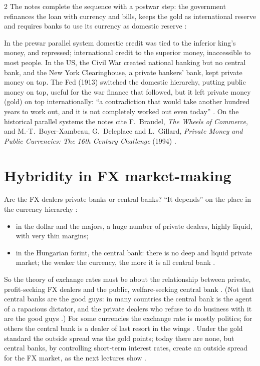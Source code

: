\begin{paracol}{2}
The notes complete the sequence with a postwar step: the government refinances the loan with currency and bills, keeps the gold as international reserve and requires banks to use its
currency as domestic reserve :
\begin{taccts}
\qquad
{}
\end{taccts}
In the prewar parallel system domestic credit was tied to the inferior king's money, and repressed; international credit to the superior money, inaccessible to most people. In the US, the
Civil War created national banking but no central bank, and the New York Clearinghouse, a private bankers' bank, kept private money on top. The Fed (1913) switched the domestic hierarchy,
putting public money on top, useful for the war finance that followed, but it left private money (gold) on top internationally: ``a contradiction that would take another hundred years to
work out, and it is not completely worked out even today'' . On the historical parallel systems the notes cite F.~Braudel, \emph{The Wheels of Commerce}, and
M.-T.~Boyer-Xambeau, G.~Deleplace and L.~Gillard, \emph{Private Money and Public Currencies: The 16th Century Challenge} (1994) .

\section{Hybridity in FX market-making}\label{sec:cm-fxhybrid}

Are the FX dealers private banks or central banks? ``It depends'' on the place in the currency hierarchy :
\begin{itemize}
  \item in the dollar and the majors, a huge number of private dealers, highly liquid, with very thin margins;
  \item in the Hungarian forint, the central bank: there is no deep and liquid private market; the weaker the currency, the more it is all central bank .
\end{itemize}
So the theory of exchange rates must be about the relationship between private, profit-seeking FX dealers and the public, welfare-seeking central bank .
(Not that central banks are the good guys: in many countries the central bank is the agent of a rapacious dictator, and the private dealers who refuse to do business with it are
the good guys .) For some currencies the exchange rate is mostly politics; for others the central bank is a dealer of last resort in the wings
. Under the gold standard the outside spread was the gold points; today there are none, but central banks, by controlling short-term interest rates,
create an outside spread for the FX market, as the next lectures show .


\end{paracol}
